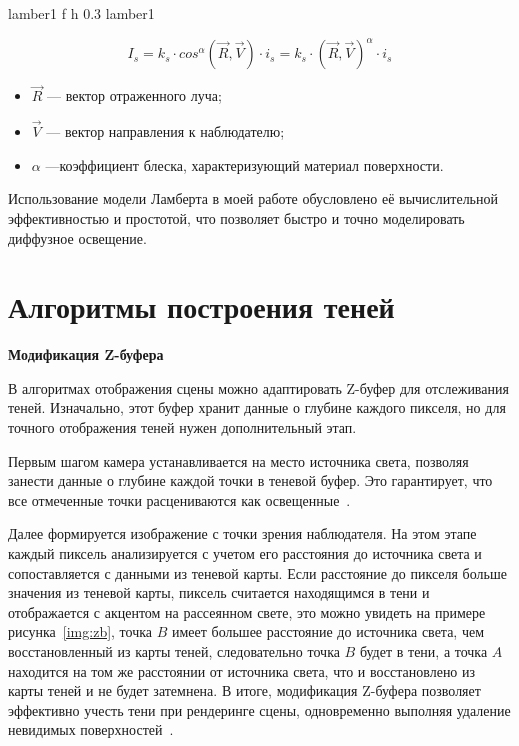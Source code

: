 {lamber1} %
{f} %
{h} %
{0.3\textwidth} %
{lamber1} %


\begin{equation}
	I_{s}=k_{s} \cdot cos^{\alpha}(\vec R, \vec V) \cdot i_{s} = k_{s} \cdot (\vec R, \vec V)^{\alpha} \cdot i_{s}
\end{equation}

\begin{itemize}
	\item $\vec R$ --- вектор отраженного луча;
	\item $\vec V$ --- вектор направления к наблюдателю;
	\item $\alpha$ ---коэффициент блеска, характеризующий материал поверхности.
\end{itemize}


Использование модели Ламберта в моей работе обусловлено её вычислительной эффективностью и простотой, что позволяет быстро и точно моделировать диффузное освещение.
\fi

\section{Алгоритмы построения теней}
\textbf{Модификация Z-буфера}

В алгоритмах отображения сцены можно адаптировать Z-буфер для отслеживания теней.
Изначально, этот буфер хранит данные о глубине каждого пикселя, но для точного отображения теней нужен дополнительный этап.

Первым шагом камера устанавливается на место источника света, позволяя занести данные о глубине каждой точки в теневой буфер. Это гарантирует, что все отмеченные точки расцениваются как освещенные~\cite{letion}.

Далее формируется изображение с точки зрения наблюдателя. На этом этапе каждый пиксель анализируется с учетом его расстояния до источника света и сопоставляется с данными из теневой карты. Если расстояние до пикселя больше значения из теневой карты, пиксель считается находящимся в тени и отображается с акцентом на рассеянном свете, это можно увидеть на примере рисунка~\ref{img:zb}, точка $ B $ имеет большее расстояние до источника света, чем восстановленный из карты теней, следовательно точка $ B $ будет в тени, а точка $ A $  находится на том же расстоянии от источника света, что и восстановлено из карты теней и не будет затемнена. В итоге, модификация Z-буфера позволяет эффективно учесть тени при рендеринге сцены, одновременно выполняя удаление невидимых поверхностей~\cite{letion}.

